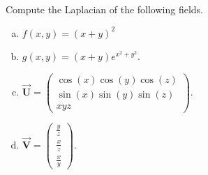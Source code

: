 \documentclass[12pt]{article} %
\newcommand{\vecfieldV}{\boldsymbol{\vec{V}}}
\newcommand{\vecfieldU}{\boldsymbol{\vec{U}}}
\begin{document}
\newpage
\begin{problem}
Compute the Laplacian of the following fields.
\begin{multicols}{2}
\begin{enumerate}[(a)]
    \item $f(x,y) = (x+y)^2$
    \item $g(x,y) = (x+y)e^{x^2+y^2}$.
    \item $\vecfieldU = \begin{pmatrix} \cos(x)\cos(y)\cos(z) \\ \sin(x)\sin(y)\sin(z) \\ xyz \end{pmatrix}$.
    \item $\vecfieldV = \begin{pmatrix} \frac{y}{z} \\ \frac{x}{z} \\ \frac{x}{y} \end{pmatrix}$.
\end{enumerate}
\end{multicols}
\end{problem}
\end{document}
